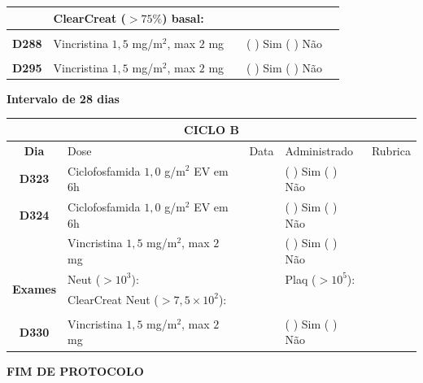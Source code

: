 \documentclass[11pt,a4paper,oldfontcommands]{memoir}
\begin{document}
\begin{center}
\begin{table}[H]
\begin{tabular}{p{1cm}p{6cm}|p{1cm}|p{3cm}|p{2.5cm}}
    \multicolumn{1}{c|}{\multirow{2}{*}{{}}}&\multicolumn{2}{l|}{ClearCreat (\(>75\%\)) basal:}&{}&{}\\
    \hline
    \\
    \hline
    \multicolumn{1}{c|}{\multirow{1}{*}{\textbf{D288}}}&{Vincristina \(1,5\) mg/m\(^2\), max \(2\) mg}&&{(  ) Sim (  ) Não}&\\
    \hline
    \\
    \hline
    \multicolumn{1}{c|}{\multirow{1}{*}{\textbf{D295}}}&{Vincristina \(1,5\) mg/m\(^2\), max \(2\) mg}&&{(  ) Sim (  ) Não}&\\
    \hline
    \end{tabular}
    \end{table}
    \textbf{Intervalo de 28 dias}
    \begin{table}[H]
    \begin{tabular}{p{1cm}p{6cm}|p{1cm}|p{3cm}|p{2.5cm}}
    \hline
	\multicolumn{5}{c}{\textbf{CICLO B}}\\
	\hline
    \multicolumn{1}{c|}{\multirow{1}{*}{\textbf{Dia}}}&{Dose}&{Data}&{Administrado}&{Rubrica} \\
    \hline
    \multicolumn{1}{c|}{\multirow{1}{*}{\textbf{D323}}}&{Ciclofosfamida \(1,0\) g/m\(^2\) EV em 6h}&&{(  ) Sim (  ) Não}&\\
    \multicolumn{1}{c|}{\multirow{1}{*}{\textbf{D324}}}&{Ciclofosfamida \(1,0\) g/m\(^2\) EV em 6h}&&{(  ) Sim (  ) Não}&\\
    \multicolumn{1}{c|}{\multirow{1}{*}{\textbf{}}}&{Vincristina \(1,5\) mg/m\(^2\), max \(2\) mg}&&{(  ) Sim (  ) Não}&\\
    \hline
    \multicolumn{1}{c|}{\multirow{2}{*}{\textbf{Exames}}}&\multicolumn{2}{l|}{Neut (\(>10^3\)):}&{Plaq (\(>10^5\)):}&\\
    \cline{2-5}
    \multicolumn{1}{c|}{\multirow{2}{*}{{}}}&\multicolumn{2}{l|}{ClearCreat  Neut (\(>7,5\times10^2\)):}&{}&{}\\
    \hline
   \\
    \hline
    \multicolumn{1}{c|}{\multirow{1}{*}{\textbf{D330}}}&{Vincristina \(1,5\) mg/m\(^2\), max \(2\) mg}&&{(  ) Sim (  ) Não}&\\
    \hline
\end{tabular}
\end{table}
\textbf{FIM DE PROTOCOLO}

\end{center}
\end{document}

